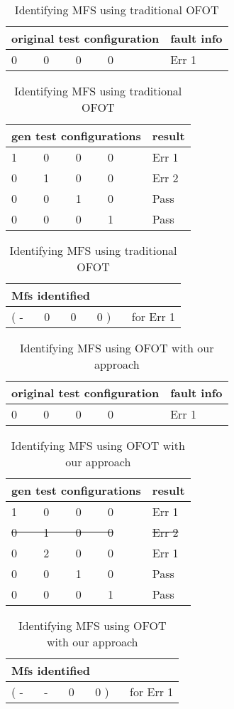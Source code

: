 \documentclass{sig-alternate}
\begin{document}
\begin{table}\renewcommand{\arraystretch}{1.3}
\caption{Identifying MFS using traditional OFOT}
\label{ofot}

\begin{tabular}{|p{}|p{}|} \hline
\bfseries original test configuration & \bfseries fault info \\ \hline
0 \ \ \ \ 0 \ \ \ \  0 \ \ \ \  0  & Err 1
\end{tabular}

\begin{tabular}{|p{}|p{}|} \hline
\bfseries gen test configurations   &\bfseries result \\ \hline
1  \ \ \ \  0 \ \ \ \  0  \ \ \ \  0 & Err 1 \\
0  \ \ \ \  1 \ \ \ \  0  \ \ \ \  0 & Err 2 \\
0  \ \ \ \  0 \ \ \ \  1  \ \ \ \  0 & Pass \\
0  \ \ \ \  0 \ \ \ \  0  \ \ \ \  1 & Pass
\end{tabular}

\begin{tabular}{|p{}|} \hline
\bfseries Mfs identified \\ \hline
(  -  \ \ \  0 \ \ \  0  \ \ \ 0 ) \ \ \ for Err 1 \\
\hline
\end{tabular}
\end{table}



\begin{table}\renewcommand{\arraystretch}{1.3}
\caption{Identifying MFS using OFOT with our approach}
\label{ofot-aug}

\begin{tabular}{|p{}|p{}|} \hline
\bfseries original test configuration & \bfseries fault info \\ \hline
0 \ \ \ \ 0 \ \ \ \  0 \ \ \ \  0  & Err 1
\end{tabular}

\begin{tabular}{|p{}|p{}|} \hline
\bfseries gen test configurations   &\bfseries result \\ \hline
1  \ \ \ \  0 \ \ \ \  0  \ \ \ \  0 & Err 1 \\
\sout{0  \ \ \ \  1 \ \ \ \  0  \ \ \ \  0 } & \sout{Err 2} \\
0  \ \ \ \  2 \ \ \ \  0  \ \ \ \  0 & Err 1 \\
0  \ \ \ \  0 \ \ \ \  1  \ \ \ \  0 & Pass \\
0  \ \ \ \  0 \ \ \ \  0  \ \ \ \  1 & Pass
\end{tabular}

\begin{tabular}{|p{}|} \hline
\bfseries Mfs identified \\ \hline
(  -  \ \ \  - \ \ \  0  \ \ \ 0 ) \ \ \ for Err 1 \\
\hline
\end{tabular}
\end{table}
\end{document}
